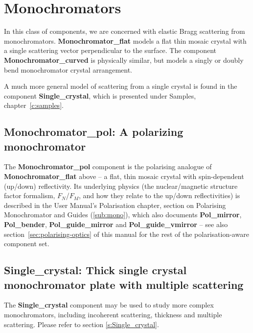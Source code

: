 
\chapter{Monochromators}

In this class of components, we are concerned with elastic Bragg
scattering from monochromators. \textbf{Monochromator\_flat}
models a flat thin mosaic crystal with a single scattering vector
perpendicular to the surface.
The component \textbf{Monochromator\_curved} is physically similar,
but models a singly or doubly bend monochromator crystal arrangement.

A much more general model of scattering from a single crystal is
found in the component \textbf{Single\_crystal},
which is presented under Samples, chapter~\ref{c:samples}.





\section{Monochromator\_pol: A polarizing monochromator}

The \textbf{Monochromator\_pol} component is the polarising analogue of
\textbf{Monochromator\_flat} above -- a flat, thin mosaic crystal with
spin-dependent (up/down) reflectivity. Its underlying physics (the
nuclear/magnetic structure factor formalism, $F_N$/$F_M$, and how they
relate to the up/down reflectivities) is described in the User Manual's
Polarisation chapter, section on Polarising Monochromator and Guides
(\ref{sub:mono}), which also documents \textbf{Pol\_mirror},
\textbf{Pol\_bender}, \textbf{Pol\_guide\_mirror} and
\textbf{Pol\_guide\_vmirror} -- see also section~\ref{sec:polarising-optics}
of this manual for the rest of the polarisation-aware component set.



\section{Single\_crystal: Thick single crystal monochromator plate with multiple scattering}

The \textbf{Single\_crystal} component may be used to study more complex monochromators, including incoherent scattering, thickness and multiple scattering. Please refer to section \ref{s:Single_crystal}.

